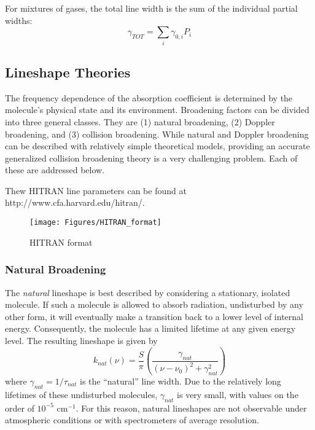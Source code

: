 \documentclass[11pt]{article}
\begin{document}
For mixtures of gases, the total line width is the sum of the individual
partial widths:
\begin{equation}
\gamma_{TOT}=\sum_i \gamma_{0,i}P_i
\end{equation}

\subsection{Lineshape Theories}\label{sec:shapetheory}

The frequency dependence of the absorption coefficient is determined by the 
molecule's physical state and its environment.  Broadening factors can be 
divided into three general classes.  They are (1) natural broadening,
(2) Doppler broadening, and (3) collision broadening.  While natural and 
Doppler broadening can be described with relatively simple theoretical
models, providing an accurate generalized collision broadening theory is a 
very challenging problem.  Each of these are addressed below.

Thew HITRAN line parameters can be found at 
http://www.cfa.harvard.edu/hitran/. 
\begin{figure}[h]
  \begin{center}\texttt{[image: Figures/HITRAN\_format]}\end{center}
  \caption{HITRAN format}
  \label{fig:hitran}
\end{figure}

\subsubsection{Natural Broadening}\label{sec:natural}

The {\it natural} lineshape is best described by considering a stationary,
isolated molecule. If such a molecule is allowed to absorb radiation,
undisturbed by any other form, it will eventually make a transition back 
to a lower level of internal energy.  Consequently, the molecule has a 
limited lifetime at any given energy level.  The resulting lineshape is 
given by
\begin{equation}
 k_{nat}(\nu)=\frac{S}{\pi}\left(\frac{\gamma_{nat}}
{(\nu-\nu_{0})^{2}+\gamma_{nat}^{2}}\right)
\end{equation}
where $\gamma_{nat}=1/\tau_{nat}$ is the ``natural'' line width.  Due to
the relatively long lifetimes of these undisturbed molecules, 
$\gamma_{nat}$ is very small, with values on the order of
$10^{-5}$ cm$^{-1}$.  For this reason, natural lineshapes are not 
observable 
under atmospheric conditions or with spectrometers of average resolution.
\end{document}

